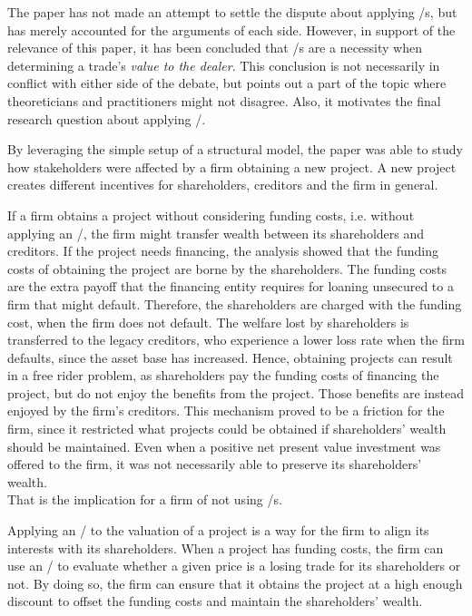 \documentclass[main.tex]{subfiles}
\begin{document}
    The paper has not made an attempt to settle the dispute about applying \FVA/s,
    but has merely accounted for the arguments of each side.
    However, in support of the relevance of this paper,
    it has been concluded that \FVA/s are a necessity 
    when determining a trade's \textit{value to the dealer}.
    This conclusion is not necessarily in conflict with either side of the debate,
    but points out a part of the topic where theoreticians and practitioners might not disagree.
    Also, it motivates the final research question about applying \FVA/.

    \textbf{\researchQuestionFvaImplications}
    By leveraging the simple setup of a structural model,
    the paper was able to study how stakeholders were affected by a firm obtaining a new project.
    A new project creates different incentives for shareholders, creditors and the firm in general.

    If a firm obtains a project without considering funding costs, 
    i.e. without applying an \FVA/,
    the firm might transfer wealth between its shareholders and creditors.
    If the project needs financing, 
    the analysis showed that the funding costs 
    of obtaining the project are borne by the shareholders.
    The funding costs are the extra payoff that the financing entity requires
    for loaning unsecured to a firm that might default.
    Therefore, the shareholders are charged with the funding cost, when the firm does not default.
    The welfare lost by shareholders is transferred to the legacy creditors,
    who experience a lower loss rate when the firm defaults, since the asset base has increased.
    Hence, obtaining projects can result in a free rider problem, 
    as shareholders pay the funding costs of financing the project,
    but do not enjoy the benefits from the project.
    Those benefits are instead enjoyed by the firm's creditors. 
    This mechanism proved to be a friction for the firm, 
    since it restricted what projects could be obtained if shareholders' wealth should be maintained.
    Even when a positive net present value investment was offered to the firm, 
    it was not necessarily able to preserve its shareholders' wealth.
    \\
    That is the implication for a firm of not using \FVA/s.

    Applying an \FVA/ to the valuation of a project is a way for the firm 
    to align its interests with its shareholders.
    When a project has funding costs,
    the firm can use an \FVA/ to evaluate
    whether a given price is a losing trade for its shareholders or not.
    By doing so, the firm can ensure that it obtains the project at a high enough discount
    to offset the funding costs and maintain the shareholders' wealth.
\end{document}
